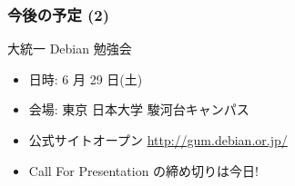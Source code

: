 \documentclass[cjk,dvipdfmx,10pt,compress,%
hyperref={bookmarks=true,bookmarksnumbered=true,bookmarksopen=false,%
colorlinks=false,%
pdftitle={第 71 回 関西 Debian 勉強会},%
pdfauthor={倉敷・のがた・佐々木・かわだ・八津尾},%
pdfsubject={資料},%
}]{beamer}
\begin{document}
\begin{frame}[fragile]
\frametitle{今後の予定 (2)}

\begin{block}{大統一 Debian 勉強会}
  \begin{itemize}
  \item 日時: 6 月 29 日(土)
  \item 会場: 東京 日本大学 駿河台キャンパス
  \item 公式サイトオープン \url{http://gum.debian.or.jp/}
  \item Call For Presentation の締め切りは今日!
  \end{itemize}
\end{block}

\end{frame}


\takahashi[50]{  }
\end{document}
